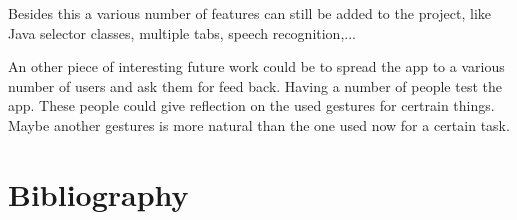 \documentclass[a4paper,12pt]{report}
\begin{document}
Besides this a various number of features can still be added to the project, like Java selector classes, multiple tabs, speech recognition,...

An other piece of interesting future work could be to spread the app to a various number of users and ask them for feed back. Having a number of people test the app. These people could give reflection on the 
used gestures for certrain things. Maybe another gestures is more natural than the one used now for a certain task.




\chapter{Bibliography}
\end{document}
